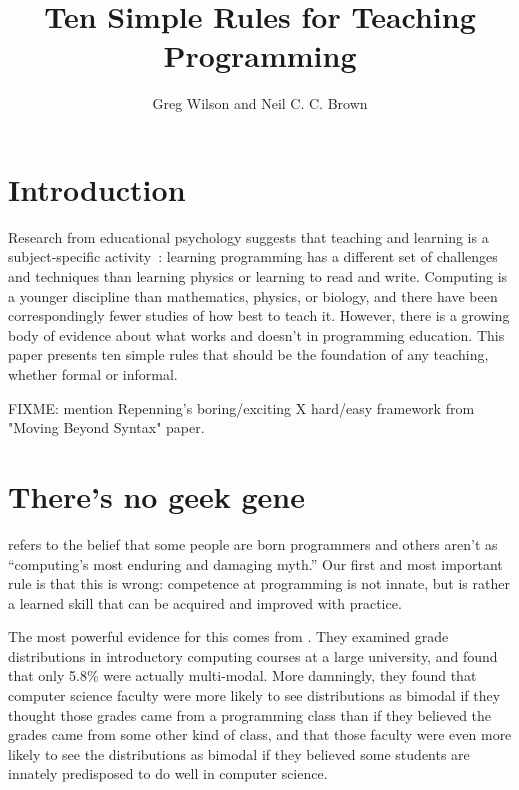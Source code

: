 \documentclass{article}
\begin{document}
\title{Ten Simple Rules for Teaching Programming}

\author{Greg Wilson and Neil C. C. Brown}


\maketitle

\section*{Introduction}

Research from educational psychology suggests that teaching and learning is a subject-specific
activity~\citep{mayer-subject}: learning programming has a different set of challenges and techniques
than learning physics or learning to read and write.  Computing is a younger discipline than
mathematics, physics, or biology, and there have been correspondingly fewer studies of how best to teach it.
However, there is a growing body of evidence about what works and doesn't in programming education.
This paper presents ten simple rules that should be the foundation of any teaching, whether
formal or informal.

FIXME: mention Repenning's boring/exciting X hard/easy framework from "Moving Beyond Syntax" paper.

\section{There's no geek gene} %

\citet{guzdial-myths} refers to the belief that some people are born programmers and others aren't
as ``computing's most enduring and damaging myth.''
Our first and most important rule is that this is wrong:
competence at programming is not innate,
but is rather a learned skill that can be acquired and improved with practice.

The most powerful evidence for this comes from \citet{patitsas-bimodal}.
They examined grade distributions in introductory computing courses at a large university,
and found that only 5.8\% were actually multi-modal.
More damningly,
they found that computer science faculty were more likely to see distributions as bimodal
if they thought those grades came from a programming class
than if they believed the grades came from some other kind of class,
and that those faculty were even more likely to see the distributions as bimodal
if they believed some students are innately predisposed to do well in computer science.
\end{document}
